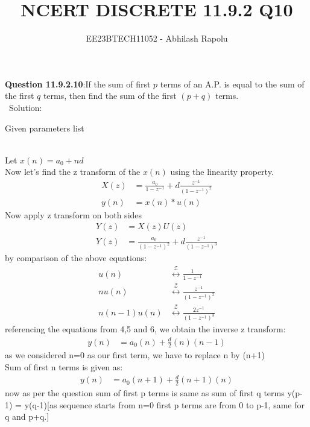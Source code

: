 \documentclass[journal,12pt,twocolumn]{IEEEtran}
\title{NCERT DISCRETE 11.9.2 Q10}
\author{EE23BTECH11052 - Abhilash Rapolu }
\begin{document}
\maketitle
\newpage
\textbf{Question 11.9.2.10}:If the sum of first $p$ terms of an A.P. is equal to the sum of the first $q$ terms, then
find the sum of the first $(p + q)$ terms.\\
\ Solution:
\begin{table}[htbp]
\centering

\caption{Given parameters list}
\end{table}
\\Let $x(n)=a_0+nd$\\
Now let's find the z transform of the $x(n)$ using the linearity property.\\
\begin{align}
X(z)&=\frac{a_0}{1-z^{-1}}+d\frac{z^{-1}}{(1-z^{-1})^2}\\
y(n) &= x(n)*u(n)
\end{align}
Now apply z transform on both sides\\
\begin{align}
Y(z)&=X(z)U(z)\\
Y(z)&=\frac{a_0}{(1-z^{-1})^2}+d\frac{z^{-1}}{(1-z^{-1})^3}
\end{align}
by comparison of the above equations:\\
\begin{align}
u(n) &\stackrel{\mathcal{Z}}{\longleftrightarrow} \frac{1}{1-z^{-1}}\\
nu(n) &\stackrel{\mathcal{Z}}{\longleftrightarrow} \frac{z^{-1}}{(1-z^{-1})^2} \\
n(n-1)u(n) &\stackrel{\mathcal{Z}}{\longleftrightarrow} \frac{2z^{-1}}{(1-z^{-1})^3} 
\end{align}
referencing the equations from 4,5 and 6, we obtain the inverse z transform:\\
\begin{align}
y(n)&=a_0(n)+\frac{d}{2}(n)(n-1)
\end{align}
as we considered n=0 as our first term, we have to replace n by (n+1)\\
Sum of first n terms is given as:\\
\begin{align}
y(n)&=a_0(n+1)+\frac{d}{2}(n+1)(n)
\end{align}
now as per the question sum of first p terms is same as sum of first q terms y(p-1) = y(q-1)[as sequence starts from n=0 first p terms are from 0 to p-1, same for q and p+q.]\\
\end{document}
